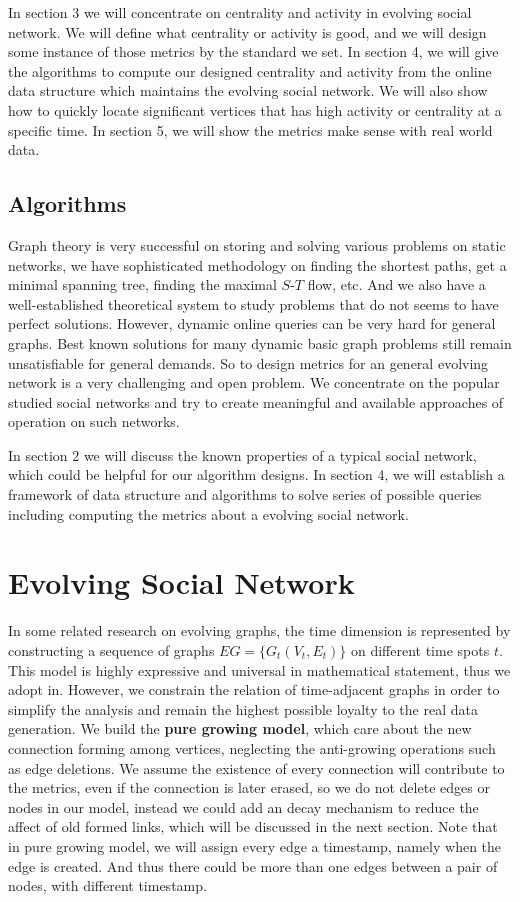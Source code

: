 \documentclass[12pt,abstract=true]{scrartcl}
\numberwithin{equation}{section}
\theoremstyle{definition}   \newtheorem{definition}{Definition}[section]
\theoremstyle{plain}        \newtheorem{theorem}{Theorem}[section]
\theoremstyle{plain}        \newtheorem{observation}{Observation}[section]
\theoremstyle{plain}        \newtheorem{fact}{Fact}[section]
\theoremstyle{plain}        \newtheorem{claim}{Claim}[section]
\theoremstyle{plain}        \newtheorem{lemma}[theorem]{Lemma}
\theoremstyle{plain}        \newtheorem{corollary}[theorem]{Corollary}
\theoremstyle{remark}       \newtheorem{example}{Example}[section]
\theoremstyle{remark}       \newtheorem{remark}{Remark}[section]
\begin{document}
In section 3 we will concentrate on centrality and activity in evolving social
network. We will define what centrality or activity is good, and we will design
some instance of those metrics by the standard we set. In section 4, we will
give the algorithms to compute our designed centrality and activity from the
online data structure which maintains the evolving social network. We will also
show how to quickly locate significant vertices that has high activity or
centrality at a specific time. In section 5, we will show the metrics make
sense with real world data.

\subsection{Algorithms}
Graph theory is very successful on storing and solving various problems on
static networks, we have sophisticated methodology on finding the shortest
paths, get a minimal spanning tree, finding the maximal $S$-$T$ flow, etc.
And we also have a well-established theoretical system to study problems that
do not seems to have perfect solutions. However, dynamic online queries can be
very hard for general graphs. Best known solutions for many dynamic basic graph
problems still remain unsatisfiable for general demands. So to design metrics
for an general evolving network is a very challenging and open problem. We
concentrate on the popular studied social networks and try to create meaningful
and available approaches of operation on such networks.

In section 2 we will discuss the known properties of a typical social network,
which could be helpful for our algorithm designs. In section 4, we will
establish a framework of data structure and algorithms to solve series of
possible queries including computing the metrics about a evolving social
network.

\section{Evolving Social Network}
In some related research on evolving graphs, the time dimension is represented
by constructing a sequence of graphs $EG=\{G_t(V_t,E_t)\}$ on different time
spots $t$. This model is highly expressive and universal in mathematical
statement, thus we adopt in. However, we constrain the relation of
time-adjacent graphs in order to simplify the analysis and remain the highest
possible loyalty to the real data generation. We build the \textbf{pure growing
model}, which care about the new connection forming among vertices, neglecting
the anti-growing operations such as edge deletions. We assume the existence of
every connection will contribute to the metrics, even if the connection is
later erased, so we do not delete edges or nodes in our model, instead we could
add an decay mechanism to reduce the affect of old formed links, which will be
discussed in the next section. Note that in pure growing model, we will assign
every edge a timestamp, namely when the edge is created. And thus there could
be more than one edges between a pair of nodes, with different timestamp.
\end{document}
